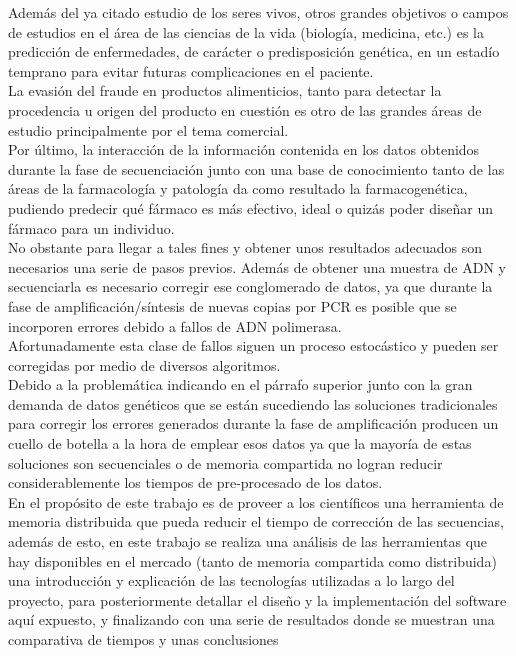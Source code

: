 \documentclass[conference]{IEEEtran}
\begin{document}
Además del ya citado estudio de los seres vivos, otros grandes objetivos o campos de estudios en el área de las ciencias de la vida (biología, medicina, etc.) es la predicción de enfermedades, de carácter o predisposición genética, en un estadío temprano para evitar futuras complicaciones en el paciente. \\
La evasión del fraude en productos alimenticios, tanto para detectar la procedencia u origen del producto en cuestión es otro de las grandes áreas de estudio principalmente por el tema comercial.\\
Por último, la interacción de la información contenida en los datos obtenidos durante la fase de secuenciación junto con una base de conocimiento tanto de las áreas de la farmacología y patología da como resultado la farmacogenética, pudiendo predecir qué fármaco es más efectivo, ideal o quizás poder diseñar un fármaco para un individuo.
\\

No obstante para llegar a tales fines y obtener unos resultados adecuados son necesarios una serie de pasos previos. Además de obtener una muestra de ADN y secuenciarla es necesario corregir ese conglomerado de datos, ya que durante la fase de amplificación/síntesis de nuevas copias por PCR es posible que se incorporen errores debido a fallos de ADN polimerasa.\\ Afortunadamente esta clase de fallos siguen un proceso estocástico y pueden ser corregidas por medio de diversos algoritmos.
\\

Debido a la problemática indicando en el párrafo superior junto con la gran demanda de datos genéticos que se están sucediendo las soluciones tradicionales para corregir los errores generados durante la fase de amplificación producen un cuello de botella a la hora de emplear esos datos ya que la mayoría de estas soluciones son secuenciales o de memoria compartida no logran reducir considerablemente los tiempos de pre-procesado de los datos.
\\

En el propósito de este trabajo es de proveer a los científicos una herramienta de memoria distribuida que pueda reducir el tiempo de corrección de las secuencias, además de esto, en este trabajo se realiza una análisis de las herramientas que hay disponibles en el mercado (tanto de memoria compartida como distribuida) una introducción y explicación de las tecnologías utilizadas a lo largo del proyecto, para posteriormente detallar el diseño y la implementación del software aquí expuesto, y finalizando con una serie de resultados donde se muestran una comparativa de tiempos y unas conclusiones
\end{document}
